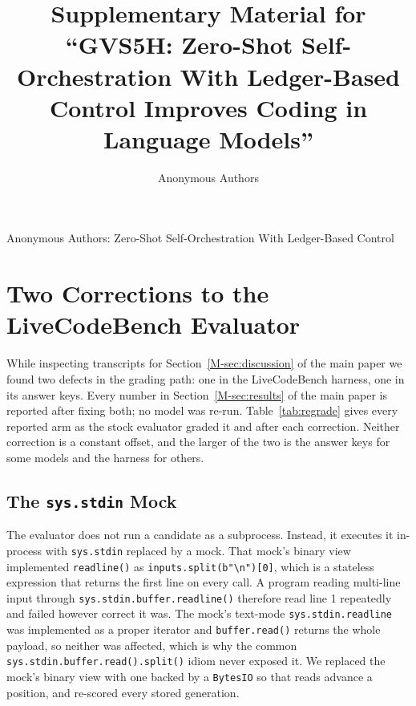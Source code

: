 \documentclass[journal,onecolumn]{IEEEtran}
\begin{document}
\title{Supplementary Material for ``GVS5H: Zero-Shot Self-Orchestration With Ledger-Based
Control Improves Coding in Language Models''}
\author{Anonymous Authors}
%
{Anonymous Authors: Zero-Shot Self-Orchestration With Ledger-Based Control}
\maketitle

\section{Two Corrections to the LiveCodeBench Evaluator}
\label{app:evaluator}



While inspecting transcripts for Section~\ref{M-sec:discussion} of the main paper we found two defects in the grading
path: one in the LiveCodeBench harness, one in its answer keys. Every number in
Section~\ref{M-sec:results} of the main paper is reported after fixing both; no model was re-run.
Table~\ref{tab:regrade} gives every reported arm as the stock evaluator graded it and after each
correction. Neither correction is a constant offset, and the larger of the two is the answer keys
for some models and the harness for others.

\subsection{The \texttt{sys.stdin} Mock} The evaluator does not run a candidate as a subprocess.
Instead, it executes it in-process with
\texttt{sys.stdin} replaced by a mock. That mock's binary view implemented \texttt{readline()} as
\texttt{inputs.split(b"\textbackslash n")[0]}, which is a stateless expression that returns the
first line on every call. A program reading multi-line input through
\texttt{sys.stdin.buffer.readline()} therefore read line 1 repeatedly and failed however correct it
was. The mock's text-mode \texttt{sys.stdin.readline} was implemented as a proper iterator and
\texttt{buffer.read()} returns the whole payload, so neither was affected, which is why the
common \texttt{sys.stdin.buffer.read().split()} idiom never exposed it. We replaced the mock's
binary view with one backed by a \texttt{BytesIO} so that reads advance a position, and re-scored
every stored generation.
\end{document}
